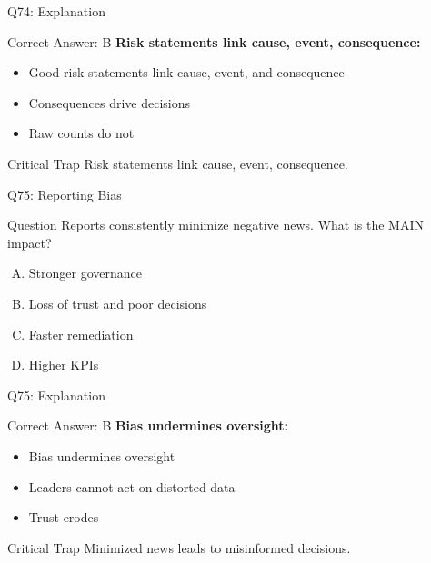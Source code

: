 \documentclass{beamer}
\begin{document}
	\begin{frame}{Q74: Explanation}
		\begin{block}{Correct Answer: B}
			\textbf{Risk statements link cause, event, consequence:}
			\begin{itemize}
				\item Good risk statements link cause, event, and consequence
				\item Consequences drive decisions
				\item Raw counts do not
			\end{itemize}
		\end{block}
		\begin{alertblock}{Critical Trap}
			Risk statements link cause, event, consequence.
		\end{alertblock}
	\end{frame}
	
	\begin{frame}{Q75: Reporting Bias}
		\begin{block}{Question}
			Reports consistently minimize negative news. What is the MAIN impact?
		\end{block}
		\begin{enumerate}[(A)]
			\item Stronger governance
			\item Loss of trust and poor decisions
			\item Faster remediation
			\item Higher KPIs
		\end{enumerate}
	\end{frame}
	
	\begin{frame}{Q75: Explanation}
		\begin{block}{Correct Answer: B}
			\textbf{Bias undermines oversight:}
			\begin{itemize}
				\item Bias undermines oversight
				\item Leaders cannot act on distorted data
				\item Trust erodes
			\end{itemize}
		\end{block}
		\begin{alertblock}{Critical Trap}
			Minimized news leads to misinformed decisions.
		\end{alertblock}
	\end{frame}
	
\end{document}
